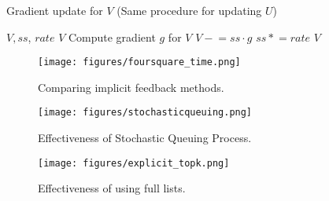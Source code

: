 \documentclass{article}
\begin{document}
\begin{algorithm}[tb]
  \caption{Gradient update for $V$ (Same procedure for updating $U$)}
  \label{alg:update}
\begin{algorithmic}
     $V, ss$, $rate$ 
     $V$
    \STATE Compute gradient $g$ for $V$ 
    \STATE $V \mathrel{-}= ss \cdot g$
    \STATE $ss \mathrel{*}= rate$
     $V$
\end{algorithmic}
\end{algorithm}

\begin{figure}[ht]
\vskip 0.2in
\begin{center}
\centerline{\texttt{[image: figures/foursquare\_time.png]}}
\caption{Comparing implicit feedback methods.}
\label{time2}
\end{center}
\vskip -0.2in
\end{figure}

\begin{figure}[ht]
\vskip 0.2in
\begin{center}
\centerline{\texttt{[image: figures/stochasticqueuing.png]}}
\caption{Effectiveness of Stochastic Queuing Process.}
\label{sqp}
\end{center}
\vskip -0.2in
\end{figure}

\begin{figure}[ht]
\vskip 0.2in
\begin{center}
\centerline{\texttt{[image: figures/explicit\_topk.png]}}
\caption{Effectiveness of using full lists.}
\label{explicit_topk}
\end{center}
\vskip -0.2in
\end{figure}
\end{document}
